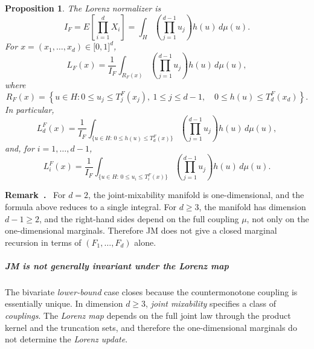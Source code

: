 \documentclass[onecolumn]{article}
\newtheorem{proposition}[theorem]{Proposition}
\newenvironment{remark}{  \refstepcounter{theorem}  \par\medskip\noindent\textbf{Remark~\thetheorem.}\rmfamily\ }{\par\medskip}
\begin{document}
\begin{proposition}
\medskip \noindent \textbf{\label{JM-dm1}} The Lorenz normalizer is 
\begin{equation}
I_{F}=E\left[ \prod_{i=1}^{d}X_{i}\right] =\int_{H}\left(
\prod_{j=1}^{d-1}u_{j}\right) h(u)\,d\mu (u).  \label{2059}
\end{equation}%
For $x=(x_{1},\ldots ,x_{d})\in \lbrack 0,1]^{d}$, 
\begin{equation}
L_{F}(x)=\frac{1}{I_{F}}\int_{R_{F}(x)}\left( \prod_{j=1}^{d-1}u_{j}\right)
h(u)\,d\mu (u),  \label{2060}
\end{equation}%
where 
\begin{equation*}
R_{F}(x)=\left\{ u\in H:0\leq u_{j}\leq T_{j}^{F}(x_{j}),\ 1\leq j\leq
d-1,\quad 0\leq h(u)\leq T_{d}^{F}(x_{d})\right\} .
\end{equation*}%
In particular, 
\begin{equation}
L_{d}^{F}(x)=\frac{1}{I_{F}}\int_{\{u\in H:\,0\leq h(u)\leq
T_{d}^{F}(x)\}}\left( \prod_{j=1}^{d-1}u_{j}\right) h(u)\,d\mu (u),
\label{2061}
\end{equation}%
and, for $i=1,\ldots ,d-1$, 
\begin{equation}
L_{i}^{F}(x)=\frac{1}{I_{F}}\int_{\{u\in H:\,0\leq u_{i}\leq
T_{i}^{F}(x)\}}\left( \prod_{j=1}^{d-1}u_{j}\right) h(u)\,d\mu (u).
\label{2062}
\end{equation}%
\medskip
\end{proposition}

\begin{remark}
\medskip For $d=2$, the joint-mixability manifold is one-dimensional, and
the formula above reduces to a single integral. For $d\geq 3$, the manifold
has dimension $d-1\geq 2$, and the right-hand sides depend on the full
coupling $\mu $, not only on the one-dimensional marginals. Therefore JM
does not give a closed marginal recursion in terms of $(F_{1},\ldots ,F_{d})$
alone. \medskip
\end{remark}

\subparagraph{JM is not generally invariant under the Lorenz map}

The bivariate \textit{lower-bound} case closes because the countermonotone
coupling is essentially unique. In dimension $d\geq 3$, \textit{joint
mixability} specifies a class of \textit{couplings}. The \textit{Lorenz map}
depends on the full joint law through the product kernel and the truncation
sets, and therefore the one-dimensional marginals do not determine the 
\textit{Lorenz update}.
\end{document}

